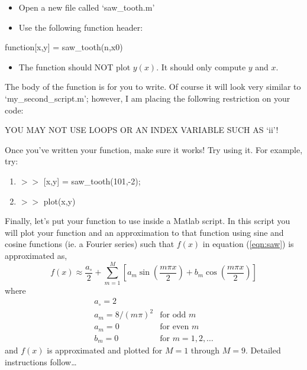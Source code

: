 \documentclass[letter]{article}
\begin{document}
\begin{itemize}
\item Open a new file called `saw\_tooth.m'
\item Use the following function header:
\end{itemize}

\centerline{function[x,y] = saw\_tooth(n,x0)}
\vspace{.5cm}

\begin{itemize}
\item The function should NOT plot $y(x)$.  It should only compute $y$
  and $x$.
\end{itemize}

The body of the function is for you to write.  Of course it will look
very similar to `my\_second\_script.m'; however, I am placing the
following restriction on your code:\\

\centerline{YOU MAY NOT USE LOOPS OR AN INDEX VARIABLE SUCH AS `ii'!}
\vspace{0.5cm}

Once you've written your function, make sure it works!  Try using
it.  For example, try:

\begin{enumerate}
\item $>>$ [x,y] = saw\_tooth(101,-2);
\item $>>$ plot(x,y)
\end{enumerate}

Finally, let's put your function to use inside a Matlab script.  In
this script you will plot your function and an approximation to that
function using sine and cosine functions (ie. a Fourier
series) such that $f(x)$ in equation (\ref{eqn:saw}) is approximated
as,
\begin{displaymath}
  f(x) \approx \frac{a_\circ}{2} + \sum_{m=1}^{M}\left[a_m\sin\left(\frac{m\pi
  x}{2}\right) + b_m\cos\left(\frac{m\pi x}{2}\right)\right]
\end{displaymath}
where
\begin{displaymath}
\begin{array}{ll}
a_\circ = 2 \\
a_m = 8/\left(m\pi\right)^2 & \text{for odd } m \\
a_m = 0 & \text{for even } m \\
b_m = 0 & \text{for } m=1,2,\ldots
\end{array}
\end{displaymath}
and $f(x)$ is approximated and plotted for $M=1$ through $M=9$.
Detailed instructions follow\ldots
\end{document}
